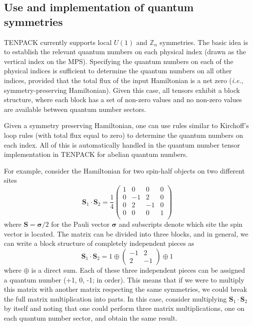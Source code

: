 \documentclass{juliacon}
\begin{document}
\begin{appendix}

\section{Use and implementation of quantum symmetries}
\label{qsymmetries}

TENPACK currently supports local $U(1)$ and $\mathbb{Z}_n$ symmetries. The basic idea is to establish the relevant quantum numbers on each physical index (drawn as the vertical index on the MPS). Specifying the quantum numbers on each of the physical indices is sufficient to determine the quantum numbers on all other indices, provided that the total flux of the input Hamiltonian is a net zero ({\it i.e.}, symmetry-preserving Hamiltonian). Given this case, all tensors exhibit a block structure, where each block has a set of non-zero values and no non-zero values are available between quantum number sectors.

Given a symmetry preserving Hamiltonian, one can use rules similar to Kirchoff's loop rules (with total flux equal to zero) to determine the quantum numbers on each index. All of this is automatically handled in the quantum number tensor implementation in TENPACK for abelian quantum numbers. 

For example, consider the Hamiltonian for two spin-half objects on two different sites
\begin{equation}
\mathbf{S}_1\cdot\mathbf{S}_2=\frac14\left(\begin{array}{cccc}
1 & 0 & 0 & 0\\
0 & -1 & 2 & 0\\
0 & 2 & -1 & 0\\
0 & 0 & 0 & 1\\
\end{array}\right)
\end{equation}
where $\mathbf{S}=\boldsymbol{\sigma}/2$ for the Pauli vector $\boldsymbol{\sigma}$ \cite{townsend2000modern} and subscripts denote which site the spin vector is located. The matrix can be divided into three blocks, and in general, we can write a block structure of completely independent pieces as
\begin{equation}
\mathbf{S}_1\cdot\mathbf{S}_2=1\oplus\left(\begin{array}{cc}
-1 & 2 \\
2 & -1
\end{array}\right)\oplus1
\end{equation}
where $\oplus$ is a direct sum. Each of these three independent pieces can be assigned a quantum number (+1, 0, -1; in order). This means that if we were to multiply this matrix with another matrix respecting the same symmetries, we could break the full matrix multiplication into parts. In this case, consider multiplying $\mathbf{S}_1\cdot\mathbf{S}_2$ by itself and noting that one could perform three matrix multiplications, one on each quantum number sector, and obtain the same result.


\end{appendix}
\end{document}

